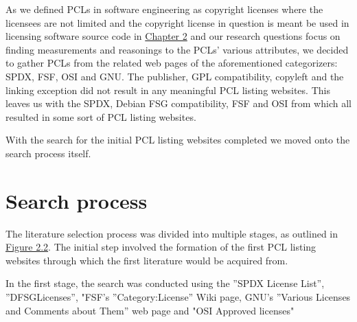 As we defined PCLs in software engineering as copyright licenses where the licensees are not limited and the copyright license in question is meant be used in licensing software source code in \hyperref[methods]{Chapter 2} and our research questions focus on finding measurements and reasonings to the PCLs' various attributes, we decided to gather PCLs from the related web pages of the aforementioned categorizers: SPDX, FSF, OSI and GNU. The publisher, GPL compatibility, copyleft and the linking exception did not result in any meaningful PCL listing websites. This leaves us with the SPDX, Debian FSG compatibility, FSF and OSI from which all resulted in some sort of PCL listing websites.

With the search for the initial PCL listing websites completed we moved onto the search process itself.

\section{Search process}
The literature selection process was divided into multiple stages, as outlined in \hyperref[fig:search-process]{Figure 2.2}. The initial step involved the formation of the first PCL listing websites through which the first literature would be acquired from.

In the first stage, the search was conducted using the ''SPDX License List'', ''DFSGLicenses'', "FSF's ''Category:License'' Wiki page, GNU's ''Various Licenses and Comments about Them'' web page and "OSI Approved licenses"

